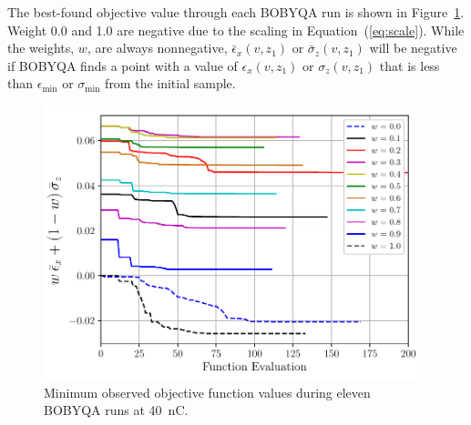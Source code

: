\documentclass{iitthesis}
\begin{document}
The best-found objective value through each BOBYQA run is shown in Figure~\ref{fig:iterations}. 
Weight 0.0 and 1.0 are negative due to the scaling in Equation~(\ref{eq:scale}). While the weights, $w$, are always nonnegative, 
$\bar{\epsilon}_x (v,z_1)$ or $\bar{\sigma}_z(v,z_1)$ will be negative if BOBYQA finds a point with a value of 
$\epsilon_x(v,z_1)$ or $\sigma_z(v,z_1)$ that is less than $\epsilon_{\min}$ or $\sigma_{\min}$ from the initial sample. 
\begin{figure}[h]
	\captionsetup{width=0.98\linewidth}
	\begin{center}
		\includegraphics[width=0.98\textwidth]{images/THPAB155f2}
		\caption{\label{fig:iterations}Minimum observed objective function values during eleven BOBYQA runs at \SI{40}{nC}.}
	\end{center}
\end{figure}
\end{document}
